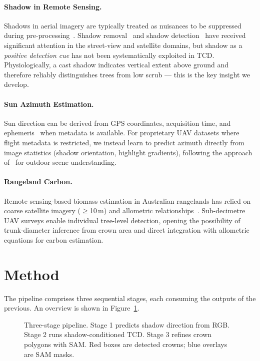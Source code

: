 \documentclass[10pt,twocolumn]{article}
\begin{document}
\paragraph{Shadow in Remote Sensing.}
Shadows in aerial imagery are typically treated as nuisances to be suppressed
during pre-processing~\cite{adeline2013shadow}. Shadow removal~\cite{liu2020shadow}
and shadow detection~\cite{wang2021shadow} have received significant attention in
the street-view and satellite domains, but shadow as a \emph{positive detection
cue} has not been systematically exploited in TCD. Physiologically, a cast shadow
indicates vertical extent above ground and therefore reliably distinguishes trees
from low scrub --- this is the key insight we develop.

\paragraph{Sun Azimuth Estimation.}
Sun direction can be derived from GPS coordinates, acquisition time, and
ephemeris~\cite{reda2004solar} when metadata is available. For proprietary UAV
datasets where flight metadata is restricted, we instead learn to predict azimuth
directly from image statistics (shadow orientation, highlight gradients), following
the approach of~\cite{lalonde2010estimating} for outdoor scene understanding.

\paragraph{Rangeland Carbon.}
Remote sensing-based biomass estimation in Australian rangelands has relied on
coarse satellite imagery ($\ge$10\,m) and allometric relationships~\cite{ma2021global}.
Sub-decimetre UAV surveys enable individual tree-level detection, opening the
possibility of trunk-diameter inference from crown area and direct integration
with allometric equations for carbon estimation.

\section{Method}

The pipeline comprises three sequential stages, each consuming the outputs of
the previous. An overview is shown in Figure~\ref{fig:pipeline}.

\begin{figure}[t]
  \centering
  \fbox{\rule{0pt}{4cm}\rule{\linewidth}{0pt}}
  \caption{Three-stage pipeline. Stage 1 predicts shadow direction from RGB.
           Stage 2 runs shadow-conditioned TCD. Stage 3 refines crown polygons
           with SAM. Red boxes are detected crowns; blue overlays are SAM masks.}
  \label{fig:pipeline}
\end{figure}
\end{document}
